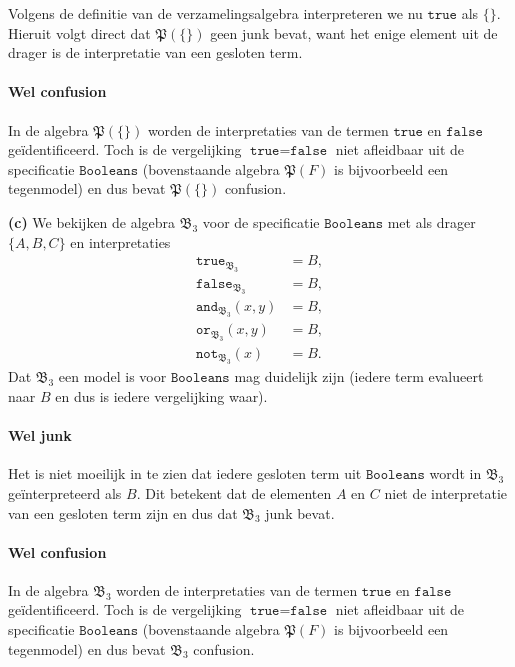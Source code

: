 \documentclass[a4paper,11pt]{article}
\begin{document}
\begin{description}
Volgens de definitie van de verzamelingsalgebra interpreteren we nu
$\texttt{true}$ als $\{\}$. Hieruit volgt direct dat $\mathfrak{P}(\{\})$ geen
junk bevat, want het enige element uit de drager is de interpretatie van een
gesloten term.

\paragraph{Wel confusion}

In de algebra $\mathfrak{P}(\{\})$ worden de interpretaties van de termen
$\texttt{true}$ en $\texttt{false}$ ge\"identificeerd. Toch is de vergelijking
$\texttt{true} = \texttt{false}$ niet afleidbaar uit de specificatie
$\texttt{Booleans}$ (bovenstaande algebra $\mathfrak{P}(F)$ is bijvoorbeeld
een tegenmodel) en dus bevat $\mathfrak{P}(\{\})$ confusion.

\item{\bf (c)} %
We bekijken de algebra $\mathfrak{B}_{3}$ voor de specificatie
$\texttt{Booleans}$ met als drager $\{A,B,C\}$ en interpretaties
\begin{align*}
\texttt{true}_{\mathfrak{B}_{3}}     &= B, \\
\texttt{false}_{\mathfrak{B}_{3}}    &= B, \\
\texttt{and}_{\mathfrak{B}_{3}}(x,y) &= B, \\
\texttt{or}_{\mathfrak{B}_{3}}(x,y)  &= B, \\
\texttt{not}_{\mathfrak{B}_{3}}(x)   &= B.
\end{align*}
Dat $\mathfrak{B}_{3}$ een model is voor $\texttt{Booleans}$ mag duidelijk
zijn (iedere term evalueert naar $B$ en dus is iedere vergelijking waar).

\paragraph{Wel junk}

Het is niet moeilijk in te zien dat iedere gesloten term uit
$\texttt{Booleans}$ wordt in $\mathfrak{B}_{3}$ ge\"interpreteerd als $B$. Dit
betekent dat de elementen $A$ en $C$ niet de interpretatie van een gesloten
term zijn en dus dat $\mathfrak{B}_{3}$ junk bevat.

\paragraph{Wel confusion}

In de algebra $\mathfrak{B}_{3}$ worden de interpretaties van de termen
$\texttt{true}$ en $\texttt{false}$ ge\"identificeerd. Toch is de vergelijking
$\texttt{true} = \texttt{false}$ niet afleidbaar uit de specificatie
$\texttt{Booleans}$ (bovenstaande algebra $\mathfrak{P}(F)$ is bijvoorbeeld
een tegenmodel) en dus bevat $\mathfrak{B}_{3}$ confusion.

\end{description}
\end{document}
